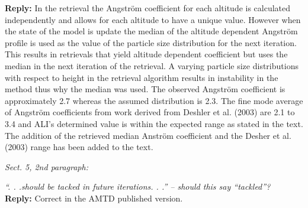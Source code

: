 \documentclass[12pt, notitlepage]{article}
\begin{document}
\textbf{Reply:} In the retrieval the Angstr\"{o}m coefficient for each altitude is calculated independently and allows for each altitude to have a unique value. However when the state of the model is update the median of the altitude dependent Angstr\"{o}m profile is used as the value of the particle size distribution for the next iteration. This results in retrievals that yield altitude dependent coefficient but uses the median in the next iteration of the retrieval. A varying particle size distributions with respect to height in the retrieval algorithm results in instability in the method thus why the median was used. The observed Angstr\"{o}m coefficient is approximately 2.7 whereas the assumed distribution is 2.3. The fine mode average of Angstr\"{o}m coefficients from work derived from Deshler et al. (2003) are 2.1 to 3.4 and ALI's determined value is within the expected range as stated in the text. The addition of the retrieved median Anstr\"{o}m coefficient and the Desher et al. (2003) range has been added to the text.

\hrulefill

\textit{Sect. 5, 2nd paragraph:}

\textit{``. . .should be tacked in future iterations. . .'' – should this say ``tackled''?}\\

\textbf{Reply:} Correct in the AMTD published version.

\hrulefill
\end{document}
